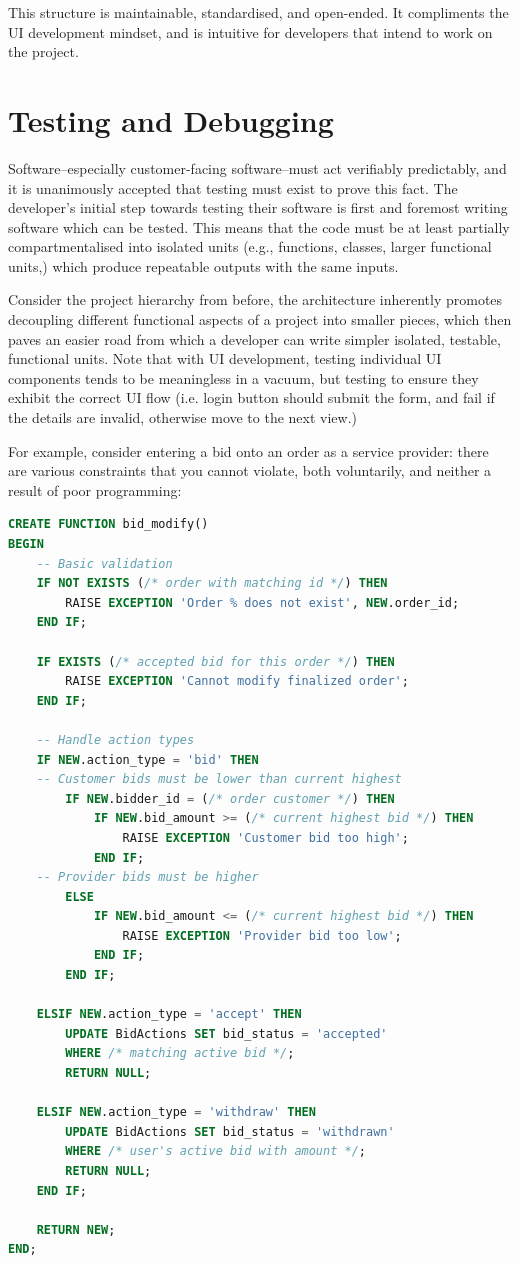 \documentclass[journal]{IEEEtran}
\begin{document}
	This structure is maintainable, standardised, and open-ended. It compliments the UI development mindset, and is intuitive for developers that intend to work on the project.
	
	\section{Testing and Debugging}
	Software--especially customer-facing software--must act verifiably predictably, and it is unanimously accepted that testing must exist to prove this fact. The developer's initial step towards testing their software is first and foremost writing software which can be tested. This means that the code must be at least partially compartmentalised into isolated units (e.g., functions, classes, larger functional units,) which produce repeatable outputs with the same inputs.
	
	Consider the project hierarchy from before, the architecture inherently promotes decoupling different functional aspects of a project into smaller pieces, which then paves an easier road from which a developer can write simpler isolated, testable, functional units. Note that with UI development, testing individual UI components tends to be meaningless in a vacuum, but testing to ensure they exhibit the correct UI flow (i.e. login button should submit the form, and fail if the details are invalid, otherwise move to the next view.)
	
	For example, consider entering a bid onto an order as a service provider: there are various constraints that you cannot violate, both voluntarily, and neither a result of poor programming:
	
	\begin{lstlisting}[language=SQL]
CREATE FUNCTION bid_modify()
BEGIN
	-- Basic validation
	IF NOT EXISTS (/* order with matching id */) THEN
		RAISE EXCEPTION 'Order % does not exist', NEW.order_id;
	END IF;
	
	IF EXISTS (/* accepted bid for this order */) THEN
		RAISE EXCEPTION 'Cannot modify finalized order';
	END IF;
	
	-- Handle action types
	IF NEW.action_type = 'bid' THEN
	-- Customer bids must be lower than current highest
		IF NEW.bidder_id = (/* order customer */) THEN
			IF NEW.bid_amount >= (/* current highest bid */) THEN
				RAISE EXCEPTION 'Customer bid too high';
			END IF;
	-- Provider bids must be higher
		ELSE
			IF NEW.bid_amount <= (/* current highest bid */) THEN
				RAISE EXCEPTION 'Provider bid too low';
			END IF;
		END IF;
	
	ELSIF NEW.action_type = 'accept' THEN
		UPDATE BidActions SET bid_status = 'accepted'
		WHERE /* matching active bid */;
		RETURN NULL;
	
	ELSIF NEW.action_type = 'withdraw' THEN
		UPDATE BidActions SET bid_status = 'withdrawn'
		WHERE /* user's active bid with amount */;
		RETURN NULL;
	END IF;
	
	RETURN NEW;
END;
	\end{lstlisting}
	
\end{document}

